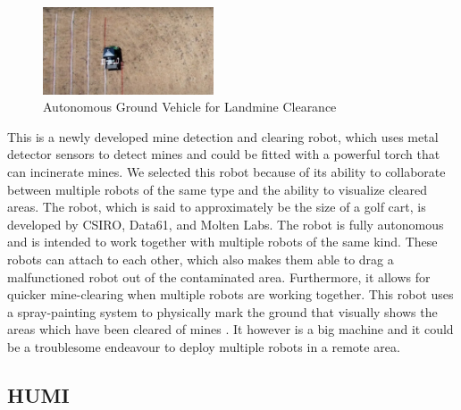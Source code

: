 \begin{figure}
    \centering
      \includegraphics[width=0.45\textwidth]{00 - Images/autonomous_ground_vehicle_for_landmine_clearance.jpg}
  \caption{Autonomous Ground Vehicle for Landmine Clearance \cite{CSIRO2020}}
  \label{fig:autonomous_ground_vehicle_for_landmine_clearance}
\end{figure}
This is a newly developed mine detection and clearing robot, which uses metal detector sensors to detect mines and could be fitted with a powerful torch that can incinerate mines. We selected this robot because of its ability to collaborate between multiple robots of the same type and the ability to visualize cleared areas. The robot, which is said to approximately be the size of a golf cart, is developed by CSIRO, Data61, and Molten Labs. The robot is fully autonomous and is intended to work together with multiple robots of the same kind. These robots can attach to each other, which also makes them able to drag a malfunctioned robot out of the contaminated area. Furthermore, it allows for quicker mine-clearing when multiple robots are working together. This robot uses a spray-painting system to physically mark the ground that visually shows the areas which have been cleared of mines \cite{CSIRO2020}. It however is a big machine and it could be a troublesome endeavour to deploy multiple robots in a remote area.


\subsection{HUMI}

